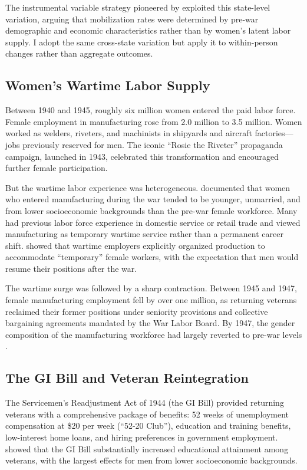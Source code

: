 \documentclass[12pt]{article}
\begin{document}
The instrumental variable strategy pioneered by \citet{acemoglu2004women} exploited this state-level variation, arguing that mobilization rates were determined by pre-war demographic and economic characteristics rather than by women's latent labor supply. I adopt the same cross-state variation but apply it to within-person changes rather than aggregate outcomes.

\subsection{Women's Wartime Labor Supply}

Between 1940 and 1945, roughly six million women entered the paid labor force. Female employment in manufacturing rose from 2.0 million to 3.5 million. Women worked as welders, riveters, and machinists in shipyards and aircraft factories---jobs previously reserved for men. The iconic ``Rosie the Riveter'' propaganda campaign, launched in 1943, celebrated this transformation and encouraged further female participation.

But the wartime labor experience was heterogeneous. \citet{goldin1991role} documented that women who entered manufacturing during the war tended to be younger, unmarried, and from lower socioeconomic backgrounds than the pre-war female workforce. Many had previous labor force experience in domestic service or retail trade and viewed manufacturing as temporary wartime service rather than a permanent career shift. \citet{milkman1987gender} showed that wartime employers explicitly organized production to accommodate ``temporary'' female workers, with the expectation that men would resume their positions after the war.

The wartime surge was followed by a sharp contraction. Between 1945 and 1947, female manufacturing employment fell by over one million, as returning veterans reclaimed their former positions under seniority provisions and collective bargaining agreements mandated by the War Labor Board. By 1947, the gender composition of the manufacturing workforce had largely reverted to pre-war levels \citep{anderson1981wartime, hartmann1982home}.

\subsection{The GI Bill and Veteran Reintegration}

The Servicemen's Readjustment Act of 1944 (the GI Bill) provided returning veterans with a comprehensive package of benefits: 52 weeks of unemployment compensation at \$20 per week (``52-20 Club''), education and training benefits, low-interest home loans, and hiring preferences in government employment. \citet{bound2002going} showed that the GI Bill substantially increased educational attainment among veterans, with the largest effects for men from lower socioeconomic backgrounds.
\end{document}

